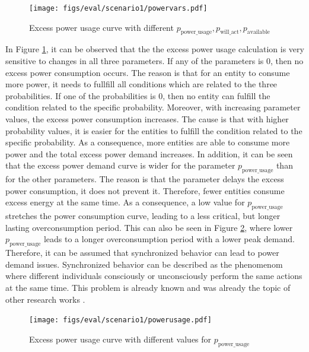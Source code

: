 \begin{figure}[!ht]
    \centering
    \texttt{[image: figs/eval/scenario1/powervars.pdf]}
    \caption{Excess power usage curve with different 
    $p_{\mathrm{power\_usage}}, p_{\mathrm{will\_act}}, 
    p_{\mathrm{available}}$}
    \label{scen1variablepowervals} 
\end{figure}

In Figure \ref{scen1variablepowervals}, it can be observed that
the the excess power usage calculation 
is very sensitive to changes in all
three parameters. If any of the parameters is $0$, then no
excess power consumption occurs. The reason is that 
for an entity to consume more power, it needs to fullfill
all conditions which are related to the three 
probabilities. If one of the probabilities is $0$, then 
no entity can fulfill the condition related to the 
specific probability. Moreover, with increasing parameter
values, the excess power consumption increases. The 
cause is that with higher probability values, it is 
easier for the entities to fulfill the condition
related to the specific probability. As a 
consequence, more entities are able to consume more 
power and the total excess power demand increases.
In addition, it can be seen that the excess power 
demand curve is wider for the parameter 
$p_{\mathrm{power\_usage}}$ than for the other parameters.
The reason is that the parameter delays the 
excess power consumption, it does not prevent it.
Therefore, fewer entities consume excess energy at the 
same time. As a consequence, 
a low value for $p_{\mathrm{power\_usage}}$
stretches the power consumption curve, leading
to a less critical, but longer lasting 
overconsumption period. This can also be seen in Figure 
\ref{scen1variablepowerusage}, where lower 
$p_{\mathrm{power\_usage}}$ leads to 
a longer overconsumption period with a lower peak demand.
Therefore, it can be assumed that synchronized 
behavior can lead to power demand issues.
Synchronized behavior can be described 
as the phenomenom where different individuals
consciously or unconsciously
perform the same actions at the same time.
This problem is already known and was
already the topic of other research works
\cite{lei2014impact} \cite{walker2014dynamics}
\cite{gebhard2022monitoring}.

\begin{figure}[!ht]
    \centering
    \texttt{[image: figs/eval/scenario1/powerusage.pdf]}
    \caption{Excess power usage curve with different values for 
    $p_{\mathrm{power\_usage}}$}
    \label{scen1variablepowerusage} 
\end{figure}

